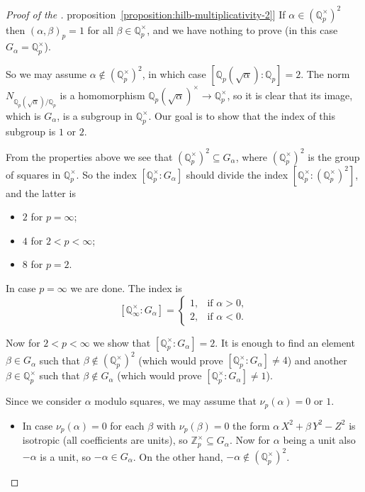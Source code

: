 \documentclass{article}
\newcommand{\ZZ}{\mathbb{Z}}
\newcommand{\QQ}{\mathbb{Q}}
\newcommand{\refref}[2]{\hyperref[#2]{#1~\ref*{#2}}}
\theoremstyle{myplain}
\theoremstyle{mydefinition}
\begin{document}
\begin{proof}[Proof of the \refref{proposition}{proposition:hilb-multiplicativity-2}]
  If $\alpha \in (\QQ_p^\times)^2$ then $(\alpha,\beta)_p = 1$ for all
  $\beta \in \QQ_p^\times$, and we have nothing to prove (in this case
  $G_\alpha = \QQ_p^\times$).

  So we may assume $\alpha \notin (\QQ_p^\times)^2$, in which case
  $[\QQ_p (\sqrt{\alpha}) : \QQ_p] = 2$. The norm
  $N_{\QQ_p (\sqrt{\alpha}) / \QQ_p}$ is a homomorphism
  $\QQ_p (\sqrt{\alpha})^\times \to \QQ_p^\times$, so it is clear that its
  image, which is $G_\alpha$, is a subgroup in $\QQ_p^\times$. Our goal is to
  show that the index of this subgroup is $1$ or $2$.

  From the properties above we see that $(\QQ_p^\times)^2 \subseteq G_\alpha$,
  where $(\QQ_p^\times)^2$ is the group of squares in $\QQ_p^\times$. So the
  index $[\QQ_p^\times : G_\alpha]$ should divide the index
  $[\QQ_p^\times : (\QQ_p^\times)^2]$, and the latter is
  \begin{itemize}
  \item $2$ for $p = \infty$;
  \item $4$ for $2 < p < \infty$;
  \item $8$ for $p = 2$.
  \end{itemize}

  In case $p = \infty$ we are done. The index is
  \[ [\QQ_\infty^\times : G_\alpha] = \left\{\begin{array}{ll}
                                               1, & \text{if }\alpha > 0,\\
                                               2, & \text{if } \alpha < 0.
                                             \end{array}\right. \]

  Now for $2 < p < \infty$ we show that $[\QQ_p^\times : G_\alpha] = 2$. It is
  enough to find an element $\beta \in G_\alpha$ such that
  $\beta \notin (\QQ_p^\times)^2$ (which would prove
  $[\QQ_p^\times : G_\alpha] \ne 4$) and another $\beta \in \QQ_p^\times$ such
  that $\beta \notin G_\alpha$ (which would prove
  $[\QQ_p^\times : G_\alpha] \ne 1$).

  Since we consider $\alpha$ modulo squares, we may assume that
  $ \nu_p (\alpha) = 0 \text{ or } 1$.

  \begin{itemize}
  \item In case $ \nu_p (\alpha) = 0$ for each $\beta$ with $ \nu_p (\beta) = 0$
    the form $\alpha\,X^2 + \beta\,Y^2 - Z^2$ is isotropic (all coefficients are
    units), so $\ZZ_p^\times \subseteq G_\alpha$. Now for $\alpha$ being a unit
    also $-\alpha$ is a unit, so $-\alpha \in G_\alpha$. On the other hand,
    $-\alpha \notin (\QQ_p^\times)^2$.


\end{itemize}
\end{proof}
\end{document}
